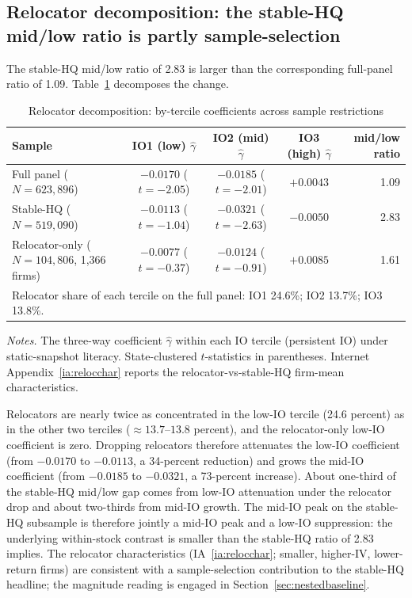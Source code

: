 \subsection{Relocator decomposition: the stable-HQ mid/low ratio is partly sample-selection}
\label{sec:relocator}

The stable-HQ mid/low ratio of 2.83 is larger than the corresponding full-panel ratio of 1.09. Table~\ref{tab:relocator} decomposes the change.

\begin{table}[t]
\centering
\caption{Relocator decomposition: by-tercile coefficients across sample restrictions}
\label{tab:relocator}
\footnotesize
\begin{minipage}{\textwidth}
\centering
\begin{tabular}{lcccr}
\toprule
Sample & IO1 (low) $\hat\gamma$ & IO2 (mid) $\hat\gamma$ & IO3 (high) $\hat\gamma$ & mid/low ratio \\
\midrule
Full panel ($N = 623{,}896$)               & $-0.0170$ ($t=-2.05$) & $-0.0185$ ($t=-2.01$) & $+0.0043$ & 1.09 \\
Stable-HQ ($N = 519{,}090$)                 & $-0.0113$ ($t=-1.04$) & $-0.0321$ ($t=-2.63$) & $-0.0050$ & 2.83 \\
Relocator-only ($N = 104{,}806$, 1{,}366 firms) & $-0.0077$ ($t=-0.37$) & $-0.0124$ ($t=-0.91$) & $+0.0085$ & 1.61 \\
\midrule
\multicolumn{5}{l}{Relocator share of each tercile on the full panel: IO1 24.6\%; IO2 13.7\%; IO3 13.8\%.} \\
\bottomrule
\end{tabular}
\end{minipage}

\medskip
{\footnotesize\textit{Notes.} The three-way coefficient $\hat\gamma$ within each IO tercile (persistent IO) under static-snapshot literacy. State-clustered $t$-statistics in parentheses. Internet Appendix~\ref{ia:relocchar} reports the relocator-vs-stable-HQ firm-mean characteristics.}
\end{table}

Relocators are nearly twice as concentrated in the low-IO tercile (24.6 percent) as in the other two terciles ($\approx 13.7$--$13.8$ percent), and the relocator-only low-IO coefficient is zero. Dropping relocators therefore attenuates the low-IO coefficient (from $-0.0170$ to $-0.0113$, a 34-percent reduction) and grows the mid-IO coefficient (from $-0.0185$ to $-0.0321$, a 73-percent increase). About one-third of the stable-HQ mid/low gap comes from low-IO attenuation under the relocator drop and about two-thirds from mid-IO growth. The mid-IO peak on the stable-HQ subsample is therefore jointly a mid-IO peak and a low-IO suppression: the underlying within-stock contrast is smaller than the stable-HQ ratio of 2.83 implies. The relocator characteristics (IA~\ref{ia:relocchar}; smaller, higher-IV, lower-return firms) are consistent with a sample-selection contribution to the stable-HQ headline; the magnitude reading is engaged in Section~\ref{sec:nestedbaseline}.

